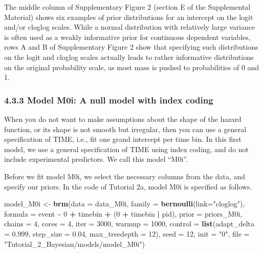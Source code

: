 \documentclass[
  man, donotrepeattitle,floatsintext]{apa6}
\newenvironment{Shaded}{\begin{snugshade}}{\end{snugshade}}
\newcommand{\AttributeTok}[1]{\textcolor[rgb]{0.13,0.29,0.53}{#1}}
\newcommand{\DecValTok}[1]{\textcolor[rgb]{0.00,0.00,0.81}{#1}}
\newcommand{\FloatTok}[1]{\textcolor[rgb]{0.00,0.00,0.81}{#1}}
\newcommand{\FunctionTok}[1]{\textcolor[rgb]{0.13,0.29,0.53}{\textbf{#1}}}
\newcommand{\NormalTok}[1]{#1}
\newcommand{\OtherTok}[1]{\textcolor[rgb]{0.56,0.35,0.01}{#1}}
\newcommand{\SpecialCharTok}[1]{\textcolor[rgb]{0.81,0.36,0.00}{\textbf{#1}}}
\newcommand{\StringTok}[1]{\textcolor[rgb]{0.31,0.60,0.02}{#1}}
\begin{document}
The middle column of Supplementary Figure 2 (section E of the Supplemental Material) shows six examples of prior distributions for an intercept on the logit and/or cloglog scales. While a normal distribution with relatively large variance is often used as a weakly informative prior for continuous dependent variables, rows A and B of Supplementary Figure 2 show that specifying such distributions on the logit and cloglog scales actually leads to rather informative distributions on the original probability scale, as most mass is pushed to probabilities of 0 and 1.

\subsubsection{4.3.3 Model M0i: A null model with index coding}\label{model-m0i-a-null-model-with-index-coding}

When you do not want to make assumptions about the shape of the hazard function, or its shape is not smooth but irregular, then you can use a general specification of TIME, i.e., fit one grand intercept per time bin. In this first model, we use a general specification of TIME using index coding, and do not include experimental predictors. We call this model ``M0i''.

Before we fit model M0i, we select the necessary columns from the data, and specify our priors. In the code of Tutorial 2a, model M0i is specified as follows.

\begin{Shaded}
\begin{Highlighting}[]
\NormalTok{model\_M0i }\OtherTok{\textless{}{-}}                    
   \FunctionTok{brm}\NormalTok{(}\AttributeTok{data =}\NormalTok{ data\_M0i,}
       \AttributeTok{family =} \FunctionTok{bernoulli}\NormalTok{(}\AttributeTok{link=}\StringTok{"cloglog"}\NormalTok{),}
       \AttributeTok{formula =}\NormalTok{ event }\SpecialCharTok{\textasciitilde{}} \DecValTok{0} \SpecialCharTok{+}\NormalTok{ timebin }\SpecialCharTok{+}\NormalTok{ (}\DecValTok{0} \SpecialCharTok{+}\NormalTok{ timebin }\SpecialCharTok{|}\NormalTok{ pid),}
       \AttributeTok{prior =}\NormalTok{ priors\_M0i,}
       \AttributeTok{chains =} \DecValTok{4}\NormalTok{, }\AttributeTok{cores =} \DecValTok{4}\NormalTok{, }
       \AttributeTok{iter =} \DecValTok{3000}\NormalTok{, }\AttributeTok{warmup =} \DecValTok{1000}\NormalTok{,}
       \AttributeTok{control =} \FunctionTok{list}\NormalTok{(}\AttributeTok{adapt\_delta =} \FloatTok{0.999}\NormalTok{, }
                      \AttributeTok{step\_size =} \FloatTok{0.04}\NormalTok{, }
                      \AttributeTok{max\_treedepth =} \DecValTok{12}\NormalTok{),}
       \AttributeTok{seed =} \DecValTok{12}\NormalTok{, }\AttributeTok{init =} \StringTok{"0"}\NormalTok{,}
       \AttributeTok{file =} \StringTok{"Tutorial\_2\_Bayesian/models/model\_M0i"}\NormalTok{)}
\end{Highlighting}
\end{Shaded}
\end{document}
